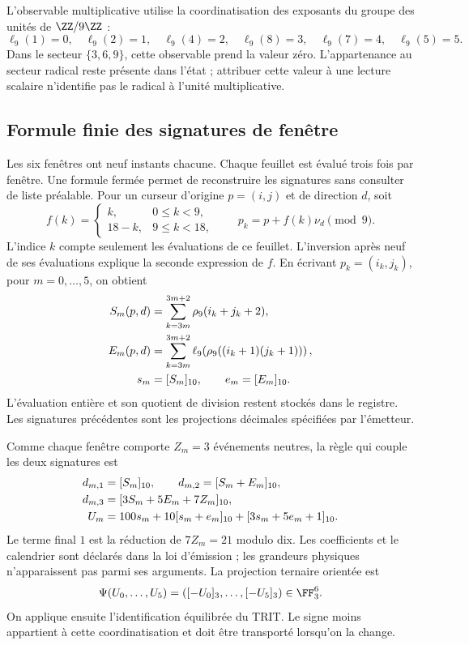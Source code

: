 L’observable multiplicative utilise la coordinatisation des exposants du groupe des
unités de \(\ZZ/9\ZZ\) :
\[
 \ell_9(1)=0,\quad\ell_9(2)=1,\quad\ell_9(4)=2,\quad
 \ell_9(8)=3,\quad\ell_9(7)=4,\quad\ell_9(5)=5.
\]
Dans le secteur \(\{3,6,9\}\), cette observable prend la valeur zéro.
L’appartenance au secteur radical reste présente dans l’état ; attribuer
cette valeur à une lecture scalaire n’identifie pas le radical à l’unité
multiplicative.

\subsection{Formule finie des signatures de fenêtre}

Les six fenêtres ont neuf instants chacune. Chaque feuillet est évalué
trois fois par fenêtre. Une formule fermée permet de reconstruire les
signatures sans consulter de liste préalable. Pour un curseur d’origine
\(p=(i,j)\) et de direction \(d\), soit
\[
 f(k)=\begin{cases}k,&0\le k<9,\\18-k,&9\le k<18,
 \end{cases}\qquad p_k=p+f(k)\nu_d\pmod9.
\]
L’indice \(k\) compte seulement les évaluations de ce feuillet.
L’inversion après neuf de ses évaluations explique la seconde
expression de \(f\). En écrivant \(p_k=(i_k,j_k)\), pour
\(m=0,\ldots,5\), on obtient
\begin{align}
 S_m(p,d)&=\sum_{k=3m}^{3m+2}\rho_9(i_k+j_k+2),\notag\\
 E_m(p,d)&=\sum_{k=3m}^{3m+2}
       \ell_9\!\left(\rho_9((i_k+1)(j_k+1))\right),\notag\\
 s_m&=[S_m]_{10},\qquad e_m=[E_m]_{10}.
 \label{vi:reg:firmas}
\end{align}
L’évaluation entière et son quotient de division restent stockés dans
le registre. Les signatures précédentes sont les projections décimales
spécifiées par l’émetteur.

Comme chaque fenêtre comporte \(Z_m=3\) événements neutres, la règle qui
couple les deux signatures est
\begin{align}
 d_{m,1}&=[S_m]_{10},\qquad
 d_{m,2}=[S_m+E_m]_{10},\notag\\
 d_{m,3}&=[3S_m+5E_m+7Z_m]_{10},\notag\\
 U_m&=100s_m+10[s_m+e_m]_{10}+[3s_m+5e_m+1]_{10}.
 \label{eq:emisor-seis}
\end{align}
Le terme final \(1\) est la réduction de \(7Z_m=21\) modulo
dix. Les coefficients et le calendrier sont déclarés dans la loi
d’émission ; les grandeurs physiques n’apparaissent pas parmi ses arguments.
La projection ternaire orientée est
\begin{equation}
 \Psi(U_0,\ldots,U_5)=([-U_0]_3,\ldots,[-U_5]_3)
 \in\FF_3^6.
 \label{eq:psi-catalogo}
\end{equation}
On applique ensuite l’identification équilibrée du TRIT. Le signe
moins appartient à cette coordinatisation et doit être transporté lorsqu’on la change.

